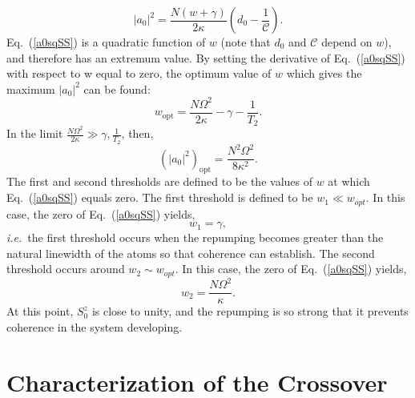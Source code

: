 \documentclass[aps,
twocolumn,
superscriptaddress,groupedaddress]{revtex4}
\begin{document}
\begin{equation}
|a_0|^2=\frac{N(w+\gamma)}{2 \kappa} (d_0 - \frac{1}{\mathcal{C}}).
\label{a0sqSS}
\end{equation}
Eq.~(\ref{a0sqSS}) is a quadratic function of $w$ (note that $d_0$ and
$\mathcal C$ depend on $w$), and therefore has an extremum value. By
setting the derivative of Eq.~(\ref{a0sqSS}) with respect to w equal
to zero, the optimum value of $w$ which gives the maximum $|a_0|^2$
can be found:
\begin{equation}
w_{\mathrm{opt}} = \frac{N \Omega^2}{2\kappa} - \gamma - \frac{1}{T_2}.
\label{wopt}
\end{equation}
In the limit $\frac{N\Omega^2}{2 \kappa} \gg \gamma, \frac{1}{T_2}$, then,
\begin{equation}
(|a_0|^2)_{\mathrm{opt}}= \frac{N^2 \Omega^2}{8\kappa^2}.
\label{adaopt}
\end{equation}
The first and second thresholds are defined to be the values of $w$ at
which Eq.~(\ref{a0sqSS}) equals zero. The first threshold is defined
to be $w_1 \ll w_{opt}$. In this case, the zero of Eq.~(\ref{a0sqSS})
yields,
\begin{equation}
w_1 = \gamma,
\label{FirstThreshold}
\end{equation} 
{\em i.e.}\ the first threshold occurs
when the repumping becomes greater than the natural linewidth of the
atoms so that coherence can establish.  The second
threshold occurs around $w_2 \sim w_{opt}$. In this case,
the zero of Eq.~(\ref{a0sqSS}) yields,
\begin{equation}
w_2 =  \frac{N \Omega^2}{\kappa}.
\end{equation} 
At this point, $S_0^{z}$ is close to unity, and the repumping is so
strong that it prevents coherence in the system developing.


\section{Characterization of the Crossover}
\label{sec:CrossoverCharacterization}
\end{document}
